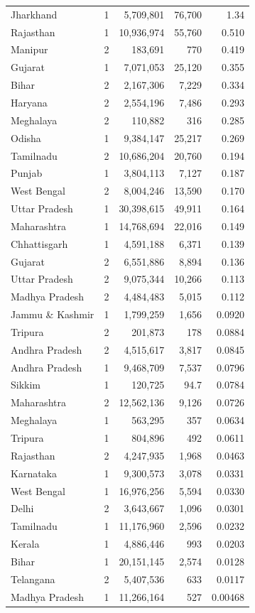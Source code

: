 \documentclass{article}
\begin{document}
\begin{center}
\begin{longtable}{l l r r r}
			Jharkhand & 1 & 5,709,801 & 76,700 & 1.34 \\
			Rajasthan & 1 & 10,936,974 & 55,760 & 0.510 \\
			Manipur & 2 & 183,691 & 770 & 0.419 \\
			Gujarat & 1 & 7,071,053 & 25,120 & 0.355 \\
			Bihar & 2 & 2,167,306 & 7,229 & 0.334 \\
			Haryana & 2 & 2,554,196 & 7,486 & 0.293 \\
			Meghalaya & 2 & 110,882 & 316 & 0.285 \\
			Odisha & 1 & 9,384,147 & 25,217 & 0.269 \\
			Tamilnadu & 2 & 10,686,204 & 20,760 & 0.194 \\
			Punjab & 1 & 3,804,113 & 7,127 & 0.187 \\
			West Bengal & 2 & 8,004,246 & 13,590 & 0.170 \\
			Uttar Pradesh & 1 & 30,398,615 & 49,911 & 0.164 \\
			Maharashtra & 1 & 14,768,694 & 22,016 & 0.149 \\
			Chhattisgarh & 1 & 4,591,188 & 6,371 & 0.139 \\
			Gujarat & 2 & 6,551,886 & 8,894 & 0.136 \\
			Uttar Pradesh & 2 & 9,075,344 & 10,266 & 0.113 \\
			Madhya Pradesh & 2 & 4,484,483 & 5,015 & 0.112 \\
			Jammu \& Kashmir & 1 & 1,799,259 & 1,656 & 0.0920 \\
			Tripura & 2 & 201,873 & 178 & 0.0884 \\
			Andhra Pradesh & 2 & 4,515,617 & 3,817 & 0.0845 \\
			Andhra Pradesh & 1 & 9,468,709 & 7,537 & 0.0796 \\
			Sikkim & 1 & 120,725 & 94.7 & 0.0784 \\
			Maharashtra & 2 & 12,562,136 & 9,126 & 0.0726 \\
			Meghalaya & 1 & 563,295 & 357 & 0.0634 \\
			Tripura & 1 & 804,896 & 492 & 0.0611 \\
			Rajasthan & 2 & 4,247,935 & 1,968 & 0.0463 \\
			Karnataka & 1 & 9,300,573 & 3,078 & 0.0331 \\
			West Bengal & 1 & 16,976,256 & 5,594 & 0.0330 \\
			Delhi & 2 & 3,643,667 & 1,096 & 0.0301 \\
			Tamilnadu & 1 & 11,176,960 & 2,596 & 0.0232 \\
			Kerala & 1 & 4,886,446 & 993 & 0.0203 \\
			Bihar & 1 & 20,151,145 & 2,574 & 0.0128 \\
			Telangana & 2 & 5,407,536 & 633 & 0.0117 \\
			Madhya Pradesh & 1 & 11,266,164 & 527 & 0.00468 \\
		
		\end{longtable}
	\end{center}
	
\end{document}

